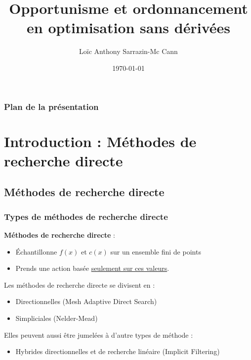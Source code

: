 \documentclass{beamer}
\title[Opportunisme et ordonnancement]{Opportunisme et ordonnancement en optimisation sans dérivées} %
\author{Loïc Anthony Sarrazin-Mc Cann} %
\institute[GERAD] %
{
	École Polytechnique de Montréal \\ %
	\medskip
}
\date{\today} %
\begin{document}
	
\begin{frame}
	\titlepage %
\end{frame}

\begin{frame}
\frametitle{Plan de la présentation} %
\tableofcontents[hideallsubsections] %
\end{frame}


\section[Introduction]{Introduction : Méthodes de recherche directe} %
\subsection{Méthodes de recherche directe}
\begin{frame}
\frametitle{Types de méthodes de recherche directe}
\textbf{Méthodes de recherche directe} :
\begin{itemize}
	\pause
	\item Échantillonne $f(x)$ et $c(x)$ sur un ensemble fini de points
	\pause
	\item Prends une action basée \underline{seulement sur ces valeurs}.
\end{itemize}
\bigskip
\pause
Les méthodes de recherche directe se divisent en :
\begin{itemize}
	\pause
	\item Directionnelles (Mesh Adaptive Direct Search)
	\pause
	\item Simpliciales (Nelder-Mead)
\end{itemize}
\pause
\medskip
Elles peuvent aussi être jumelées à d'autre types de méthode :
\begin{itemize}
	\pause
	\item Hybrides directionnelles et de recherche linéaire (Implicit Filtering)
\end{itemize}
\end{frame}
\end{document}
